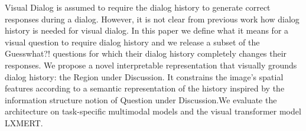 Visual Dialog is assumed to require the dialog history to generate correct responses during a dialog.  However, it is not clear from previous work how dialog history is needed for visual dialog.  In this paper we define what it means for a visual question to require dialog history and  we  release  a  subset  of  the  Guesswhat?! questions for which their dialog history completely changes their responses.   We propose a novel interpretable representation that visually grounds dialog history:  the Region under Discussion.   It  constrains  the  image's  spatial features  according  to  a  semantic  representation of the history inspired by the information structure notion of Question under Discussion.We  evaluate  the  architecture  on  task-specific multimodal models and the visual transformer model LXMERT.
